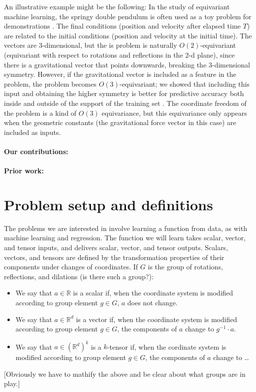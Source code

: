 \documentclass[12pt]{article}
\newcommand{\inv}{^{-1}}
\newcommand{\R}{{\mathbb R}}
\begin{document}
An illustrative example might be the following:
In the study of equivariant machine learning, the springy double pendulum is often used as a toy problem for demonstrations \cite{Finzi}.
The final conditions (position and velocity after elapsed time $T$) are related to the initial conditions (position and velocity at the initial time).
The vectors are 3-dimensional, but the is problem is naturally $O(2)$-equivariant (equivariant with respect to rotations and reflections in the 2-d plane), since there is a gravitational vector that points downwards, breaking the 3-dimensional symmetry.
However, if the gravitational vector is included as a feature in the problem, the problem becomes $O(3)$-equivariant; we showed that including this input and obtaining the higher symmetry is better for predictive accuracy both inside and outside of the support of the training set \cite{Yao}.
The coordinate freedom of the problem is a kind of $O(3)$ equivariance, but this equivariance only appears when the geometric constants (the gravitational force vector in this case) are included as inputs.

\paragraph{Our contributions:}

\paragraph{Prior work:}

\section{Problem setup and definitions}

The problems we are interested in involve learning a function from data, as with machine learning and regression.
The function we will learn takes scalar, vector, and tensor inputs, and delivers scalar, vector, and tensor outputs.
Scalars, vectors, and tensors are defined by the transformation properties of their components under changes of coordinates.
If $G$ is the group of rotations, reflections, and dilations (is there such a group?):
\begin{itemize}
  \item We say that $a\in\R$ is a scalar if, when the coordinate system is modified according to group element $g\in G$, $a$ does not change.
  \item We say that $a\in\R^d$ is a vector if, when the coordinate system is modified according to group element $g\in G$, the components of $a$ change to $g\inv\cdot a$.
  \item We say that $a\in(\R^d)^k$ is a $k$-tensor if, when the cordinate system is modified according to group element $g\in G$, the components of $a$ change to \ldots
\end{itemize}
[Obviously we have to mathify the above and be clear about what groups are in play.]
\end{document}

